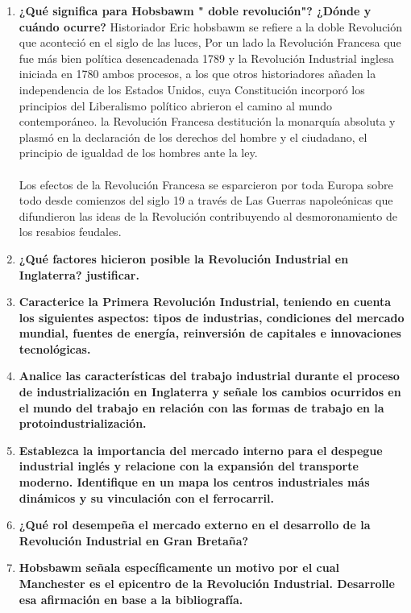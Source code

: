 \documentclass[12pt]{book}
\begin{document}
\begin{enumerate}
\item \textbf{¿Qué significa para Hobsbawm " doble revolución"? ¿Dónde y cuándo ocurre?}
Historiador Eric hobsbawm se refiere a la doble Revolución que aconteció en el siglo de las luces, Por un lado la Revolución Francesa que fue más bien política desencadenada 1789 y la Revolución Industrial inglesa iniciada en 1780 ambos procesos, a los que otros historiadores añaden la independencia de los Estados Unidos, cuya Constitución incorporó los principios del Liberalismo político abrieron el camino al mundo contemporáneo.
la Revolución Francesa destitución la monarquía absoluta y plasmó en la declaración de los derechos del hombre y el ciudadano, el principio de igualdad de los hombres ante la ley. \\
\\
Los efectos de la Revolución Francesa se esparcieron por toda Europa sobre todo desde comienzos del siglo 19 a través de Las Guerras napoleónicas que difundieron las ideas de la Revolución contribuyendo al desmoronamiento de los resabios feudales. 

\item \textbf{¿Qué factores hicieron posible la Revolución Industrial en Inglaterra? justificar.}

\item \textbf{Caracterice la Primera Revolución Industrial, teniendo en cuenta los siguientes
aspectos: tipos de industrias, condiciones del mercado mundial, fuentes de energía,
reinversión de capitales e innovaciones tecnológicas.}

\item \textbf{Analice las características del trabajo industrial durante el proceso de
industrialización en Inglaterra y señale los cambios ocurridos en el mundo del
trabajo en relación con las formas de trabajo en la protoindustrialización.}

\item \textbf{Establezca la importancia del mercado interno para el despegue industrial inglés y
relacione con la expansión del transporte moderno. Identifique en un mapa los
centros industriales más dinámicos y su vinculación con el ferrocarril.}


\item \textbf{¿Qué rol desempeña el mercado externo en el desarrollo de la Revolución Industrial
en Gran Bretaña?}

\item \textbf{Hobsbawm señala específicamente un motivo por el cual Manchester es el epicentro
de la Revolución Industrial. Desarrolle esa afirmación en base a la bibliografía.}



\end{enumerate}
\end{document}
